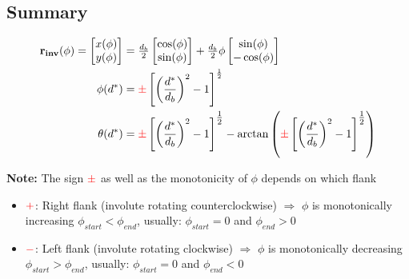 \subsection{Summary}
\begin{subequations}
\begin{align}
    \vb{r_{inv}}(\phi) = 
        \begin{bmatrix}
            x(\phi) \\
            y(\phi)
        \end{bmatrix}
                &= \tfrac{d_b}{2} \begin{bmatrix}
                        \cos(\phi) \\
                        \sin(\phi)
                    \end{bmatrix}
                    + \tfrac{d_b}{2}\phi \begin{bmatrix}
                        \sin(\phi) \\
                        -\cos(\phi)
                    \end{bmatrix} \\
    \phi(d^*)   &= \textcolor{red}{\pm}\left[\left(\frac{d^*}{d_b}\right)^2 - 1\right]^{\frac{1}{2}}\\
    \theta(d^*) &= \textcolor{red}{\pm}\left[\left(\frac{d^*}{d_b}\right)^2 - 1\right]^{\tfrac{1}{2}}
                   -\arctan\left(\textcolor{red}{\pm}\left[\left(\frac{d^*}{d_b}\right)^2 - 1\right]^{\tfrac{1}{2}}\right)
\end{align}
\end{subequations}

\textbf{Note:} The sign $\textcolor{red}{\pm}$ as well as the monotonicity of $\phi$ depends on which flank
\begin{itemize}
    \item $\textcolor{red}{+}$: Right flank (involute rotating counterclockwise) $\Rightarrow$ $\phi$ is monotonically increasing\newline
        $\phi_{start} < \phi_{end}$, usually: $\phi_{start} = 0$  and  $\phi_{end} > 0$
    \item $\textcolor{red}{-}$: Left flank (involute rotating clockwise) $\Rightarrow$ $\phi$ is monotonically decreasing\newline
        $\phi_{start} > \phi_{end}$, usually: $\phi_{start} = 0$  and  $\phi_{end} < 0$
\end{itemize}

